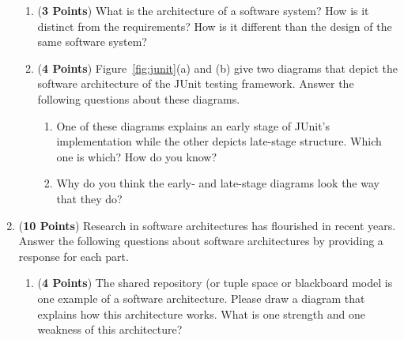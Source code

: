 \documentclass[12pt,epsf,psfig,graphicx]{article}
\begin{document}
\begin{enumerate}
\begin{enumerate}
\item ({\bf 3 Points}) What is the architecture of a software system? How is it distinct from the requirements? How is
	it different than the design of the same software system? 

\item ({\bf 4 Points}) Figure~\ref{fig:junit}(a) and (b) give two diagrams that depict the software
	architecture of the JUnit testing framework.  Answer the following questions about these diagrams.

	\begin{enumerate}
		\item One of these diagrams explains an early stage of JUnit's implementation while the other depicts late-stage
			structure.  Which one is which? How do you know?

		\item Why do you think the early- and late-stage diagrams look the way that they do?
	\end{enumerate}

% 

% 
\end{enumerate}

\newpage

\item ({\bf 10 Points}) Research in software architectures has flourished in recent years.  Answer the following
	questions about software architectures by providing a response for each part.

\begin{enumerate}

% 
\item ({\bf 4 Points}) The shared repository (or tuple space or blackboard model is one example of a
	software architecture.  Please draw a diagram that explains how this architecture works.  What is one strength and
	one weakness of this architecture?


\end{enumerate}
\end{enumerate}
\end{document}
